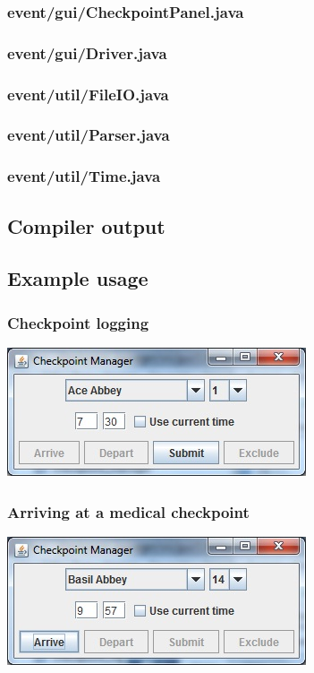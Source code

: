 \documentclass[a4paper, twoside]{article}
\begin{document}
\subsubsection{event/gui/CheckpointPanel.java}

\subsubsection{event/gui/Driver.java}

\subsubsection{event/util/FileIO.java}

\subsubsection{event/util/Parser.java}

\subsubsection{event/util/Time.java}

\subsection{Compiler output}
\subsection{Example usage}
\subsubsection{Checkpoint logging}
\includegraphics{screenshot1.jpg}
\subsubsection{Arriving at a medical checkpoint}
\includegraphics{screenshot2.jpg}
\end{document}
